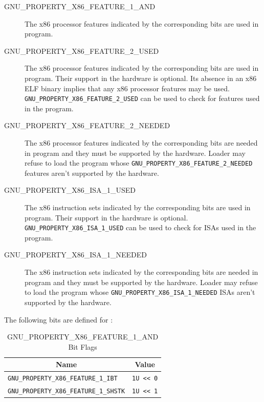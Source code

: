 \begin{description}
 \item[GNU_PROPERTY_X86_FEATURE_1_AND] The x86 processor features
   indicated by the corresponding bits are used in program.
 \item[GNU_PROPERTY_X86_FEATURE_2_USED] The x86 processor features
   indicated by the corresponding bits are used in program.  Their
   support in the hardware is optional.  Its absence in an x86 ELF
   binary implies that any x86 processor features may be used.
   \texttt{GNU_PROPERTY_X86_FEATURE_2_USED} can be used to check for
   features used in the program.
 \item[GNU_PROPERTY_X86_FEATURE_2_NEEDED] The x86 processor features
   indicated by the corresponding bits are needed in program and they
   must be supported by the hardware.  Loader may refuse to load
   the program whose \texttt{GNU_PROPERTY_X86_FEATURE_2_NEEDED}
   features aren't supported by the hardware.
 \item[GNU_PROPERTY_X86_ISA_1_USED] The x86 instruction sets indicated
   by the corresponding bits are used in program.  Their support in the
   hardware is optional.  \texttt{GNU_PROPERTY_X86_ISA_1_USED} can be
   used to check for ISAs used in the program.
 \item[GNU_PROPERTY_X86_ISA_1_NEEDED] The x86 instruction sets indicated
   by the corresponding bits are needed in program and they must be
   supported by the hardware.  Loader may refuse to load the program
   whose \texttt{GNU_PROPERTY_X86_ISA_1_NEEDED} ISAs aren't supported
   by the hardware.
\end{description}

The following bits are defined for :

\begin{table}[H]
\Hrule
  \caption{GNU_PROPERTY_X86_FEATURE_1_AND Bit Flags}
  \begin{center}
    \begin{tabular}[t]{l|l}
      \multicolumn{1}{c}{Name} & \multicolumn{1}{c}{Value} \\
      \hline
     \texttt{GNU_PROPERTY_X86_FEATURE_1_IBT} & \texttt{1U << 0} \\
     \texttt{GNU_PROPERTY_X86_FEATURE_1_SHSTK} & \texttt{1U << 1} \\
    \end{tabular}
  \end{center}
\Hrule
\end{table}

